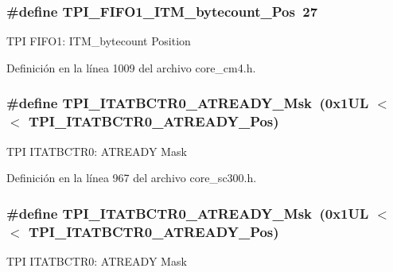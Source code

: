 \subsubsection[{\texorpdfstring{T\+P\+I\+\_\+\+F\+I\+F\+O1\+\_\+\+I\+T\+M\+\_\+bytecount\+\_\+\+Pos}{TPI_FIFO1_ITM_bytecount_Pos}}]{\setlength{\rightskip}{0pt plus 5cm}\#define T\+P\+I\+\_\+\+F\+I\+F\+O1\+\_\+\+I\+T\+M\+\_\+bytecount\+\_\+\+Pos~27}\hypertarget{group___c_m_s_i_s___t_p_i_gaa22ebf7c86e4f4b2c98cfd0b5981375a}{}\label{group___c_m_s_i_s___t_p_i_gaa22ebf7c86e4f4b2c98cfd0b5981375a}
T\+PI F\+I\+F\+O1\+: I\+T\+M\+\_\+bytecount Position 

Definición en la línea 1009 del archivo core\+\_\+cm4.\+h.

\subsubsection[{\texorpdfstring{T\+P\+I\+\_\+\+I\+T\+A\+T\+B\+C\+T\+R0\+\_\+\+A\+T\+R\+E\+A\+D\+Y\+\_\+\+Msk}{TPI_ITATBCTR0_ATREADY_Msk}}]{\setlength{\rightskip}{0pt plus 5cm}\#define T\+P\+I\+\_\+\+I\+T\+A\+T\+B\+C\+T\+R0\+\_\+\+A\+T\+R\+E\+A\+D\+Y\+\_\+\+Msk~(0x1\+U\+L $<$$<$ T\+P\+I\+\_\+\+I\+T\+A\+T\+B\+C\+T\+R0\+\_\+\+A\+T\+R\+E\+A\+D\+Y\+\_\+\+Pos)}\hypertarget{group___c_m_s_i_s___t_p_i_gaee320b3c60f9575aa96a8742c4ff9356}{}\label{group___c_m_s_i_s___t_p_i_gaee320b3c60f9575aa96a8742c4ff9356}
T\+PI I\+T\+A\+T\+B\+C\+T\+R0\+: A\+T\+R\+E\+A\+DY Mask 

Definición en la línea 967 del archivo core\+\_\+sc300.\+h.

\subsubsection[{\texorpdfstring{T\+P\+I\+\_\+\+I\+T\+A\+T\+B\+C\+T\+R0\+\_\+\+A\+T\+R\+E\+A\+D\+Y\+\_\+\+Msk}{TPI_ITATBCTR0_ATREADY_Msk}}]{\setlength{\rightskip}{0pt plus 5cm}\#define T\+P\+I\+\_\+\+I\+T\+A\+T\+B\+C\+T\+R0\+\_\+\+A\+T\+R\+E\+A\+D\+Y\+\_\+\+Msk~(0x1\+U\+L $<$$<$ T\+P\+I\+\_\+\+I\+T\+A\+T\+B\+C\+T\+R0\+\_\+\+A\+T\+R\+E\+A\+D\+Y\+\_\+\+Pos)}\hypertarget{group___c_m_s_i_s___t_p_i_gaee320b3c60f9575aa96a8742c4ff9356}{}\label{group___c_m_s_i_s___t_p_i_gaee320b3c60f9575aa96a8742c4ff9356}
T\+PI I\+T\+A\+T\+B\+C\+T\+R0\+: A\+T\+R\+E\+A\+DY Mask 

